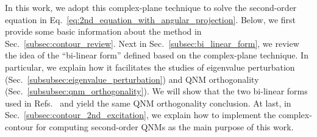 \documentclass[aps,prd,amsmath,floats,floatfix, twocolumn,
superscriptaddress,nofootinbib,showpacs]{revtex4-1}
\begin{document}
In this work, we adopt this complex-plane technique to solve the second-order equation in Eq.~\eqref{eq:2nd_equation_with_angular_projection}. Below, we first provide some basic information about the method in Sec.~\ref{subsec:contour_review}. Next in Sec.~\ref{subsec:bi_linear_form}, we review the idea of the ``bi-linear form'' defined based on the complex-plane technique. In particular, we explain how it facilitates the studies of eigenvalue perturbation (Sec.~\ref{subsubsec:eigenvalue_perturbation}) and QNM orthogonality (Sec.~\ref{subsubsec:qnm_orthogonality}). We will show that the two bi-linear forms used in Refs.~\cite{Yang:2014tla, Mark:2014aja, Zimmerman:2014aha} and \cite{Green:2022htq} yield the same QNM orthogonality conclusion. At last, in Sec.~\ref{subsec:contour_2nd_excitation}, we explain how to implement the complex-contour for computing second-order QNMs as the main purpose of this work.
\end{document}
